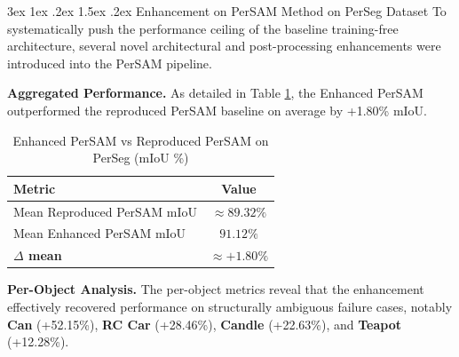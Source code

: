 \documentclass[journal,12pt,onecolumn,draftclsnofoot]{IEEEtran}
\makeatletter
\renewcommand{\subsection}{\@startsection{subsection}{2}{\z@}%
    {3ex \@plus 1ex \@minus .2ex}%
    {1.5ex \@plus.2ex}%
    {\normalfont\large\bfseries}}
\makeatother
\begin{document}
\subsection{Enhancement on PerSAM Method on PerSeg Dataset}
To systematically push the performance ceiling of the baseline training-free architecture, several novel architectural and post-processing enhancements were introduced into the PerSAM pipeline. 

\textbf{Aggregated Performance.} As detailed in Table \ref{tab:enh_persam_agg}, the Enhanced PerSAM outperformed the reproduced PerSAM baseline on average by +1.80\% mIoU.

\begin{table}[htbp]
\centering
\caption{Enhanced PerSAM vs Reproduced PerSAM on PerSeg (mIoU \%)}
\label{tab:enh_persam_agg}
\begin{tabular}{l c}
\toprule
\textbf{Metric} & \textbf{Value} \\
\midrule
Mean Reproduced PerSAM mIoU & $\approx 89.32\%$ \\
Mean Enhanced PerSAM mIoU & $91.12\%$ \\
\textbf{$\Delta$ mean} & \textbf{$\approx +1.80\%$} \\
\bottomrule
\end{tabular}
\end{table}

\textbf{Per-Object Analysis.} The per-object metrics reveal that the enhancement effectively recovered performance on structurally ambiguous failure cases, notably \textbf{Can} (+52.15\%), \textbf{RC Car} (+28.46\%), \textbf{Candle} (+22.63\%), and \textbf{Teapot} (+12.28\%).
\end{document}
